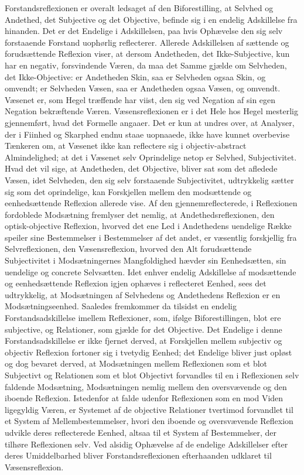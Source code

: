 \documentclass[12pt]{book}
\newcommand{\opage}[1]{\marginnote{\footnotesize\textit{[#1]}}}
\begin{document}
Forstandsreflexionen er overalt ledsaget af den Biforestilling, at Selvhed og
Andethed, det Subjective og det Objective, befinde sig i en endelig Adskillelse fra
hinanden. Det er det Endelige i Adskillelsen, paa hvis Ophævelse den sig selv
forstaaende Forstand uophørlig reflecterer. Allerede Adskillelsen af sættende og
forudsættende Reflexion viser, at dersom Andetheden, det Ikke-Subjective, kun har en
negativ, forsvindende Væren, da maa det Samme gjælde om Selvheden, det Ikke-Objective:
er Andetheden Skin, saa er Selvheden ogsaa Skin, og omvendt; er Selvheden Væsen, saa
er Andetheden ogsaa Væsen, og omvendt. Væsenet er, som Hegel træffende har viist, den
sig ved Negation af sin egen Negation bekræftende Væren. Væsensreflexionen er i det
Hele hos Hegel mesterlig gjennemført, hvad det Formelle angaaer. Det er kun at undres
over, at Analyser, der i Fiinhed og Skarphed endnu staae uopnaaede, ikke have kunnet
overbevise Tænkeren om, at Væsenet ikke kan reflectere sig i objectiv-abstract
Almindelighed; at det i Væsenet selv Oprindelige netop er Selvhed, Subjectivitet.
Hvad det vil sige, at Andetheden, det Objective, bliver sat som det afledede Væsen,
idet Selvheden, den sig selv forstaaende Subjectivitet, udtrykkelig sætter sig som det
oprindelige, kan Forskjellen mellem den modsættende og eenhedsættende Reflexion
allerede vise. Af den gjennemreflecterede, i Reflexionen fordoblede Modsætning
fremlyser det nemlig, at Andethedsreflexionen, den optisk-objective Reflexion,
hvorved det ene Led i Andethedens uendelige Række speiler sine Bestemmelser i
Bestemmelser af det andet, er væsentlig forskjellig
\opage{77} fra Selvreflexionen, den Væsensreflexion, hvorved den Alt forudsættende Subjectivitet
i Modsætningernes Mangfoldighed hævder sin Eenhedsætten, sin uendelige og concrete
Selvsætten. Idet enhver endelig Adskillelse af modsættende og eenhedsættende
Reflexion igjen ophæves i reflecteret Eenhed, sees det udtrykkelig, at Modsætningen
af Selvhedens og Andethedens Reflexion er en Modsætningseenhed. Saaledes fremkommer da
tilsidst en endelig Forstandsadskillelse imellem Reflexioner, som, ifølge
Biforestillingen, blot ere subjective, og Relationer, som gjælde for det Objective.
Det Endelige i denne Forstandsadskillelse er ikke fjernet derved, at Forskjellen
mellem subjectiv og objectiv Reflexion fortoner sig i tvetydig Eenhed; det Endelige
bliver just opløst og dog bevaret derved, at Modsætningen mellem Reflexionen som et
blot Subjectivt og Relationen som et blot Objectivt forvandles til en i Reflexionen
selv faldende Modsætning, Modsætningen nemlig mellem den oversvævende og den iboende
Reflexion. Istedenfor at falde udenfor Reflexionen som en mod Viden ligegyldig Væren,
er Systemet af de objective Relationer tvertimod forvandlet til et System af
Mellembestemmelser, hvori den iboende og oversvævende Reflexion udvikle deres
reflecterede Eenhed, altsaa til et System af Bestemmelser, der tilhøre Reflexionen
selv. Ved alsidig Ophævelse af de endelige Adskillelser efter deres Umiddelbarhed
bliver Forstandsreflexionen efterhaanden udklaret til Væsensreflexion.
\end{document}

